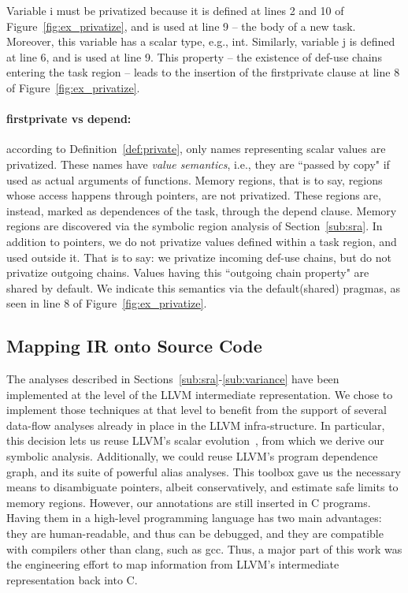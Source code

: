 \documentclass[sigplan,10pt,review,anonymous]{acmart}
\begin{document}
\begin{example}
\label{ex:priv_2}
Variable \textsf{i} must be privatized because it is defined at lines 2 and 10 of
Figure~\ref{fig:ex_privatize}, and is used at line 9 -- the body of a new task.
Moreover, this variable has a scalar type, e.g., \textsf{int}.
Similarly, variable \textsf{j} is defined at line 6, and is used at line 9.
This property -- the existence of def-use chains entering the task region --
leads to the insertion of the \textsf{firstprivate} clause at line 8 of
Figure~\ref{fig:ex_privatize}.
\end{example}

\noindent
\paragraph{firstprivate vs depend:} according to Definition~\ref{def:private},
only names representing scalar values are privatized.
These names have {\em value semantics}, i.e., they are ``passed
by copy" if used as actual arguments of functions.
Memory regions, that is to say, regions whose access happens through pointers,
are not privatized.
These regions are, instead, marked as dependences of the task, through the
\textsf{depend} clause.
Memory regions are discovered via the symbolic region analysis of
Section~\ref{sub:sra}.
In addition to pointers, we do not privatize values defined within
a task region, and used outside it.
That is to say: we privatize incoming def-use chains, but do not privatize
outgoing chains.
Values having this ``outgoing chain property" are shared by default.
We indicate this semantics via the \textsf{default(shared)} pragmas, as seen
in line 8 of Figure~\ref{fig:ex_privatize}.

\subsection{Mapping IR onto Source Code}
\label{sub:ir}

The analyses described in Sections~\ref{sub:sra}-\ref{sub:variance} have
been implemented at the level of the LLVM intermediate representation.
We chose to implement those techniques at that level to benefit from the support
of several data-flow analyses already in place in the LLVM infra-structure.
In particular, this decision lets us reuse LLVM's scalar
evolution~\cite[p.18]{Grosser12}, from which we derive our symbolic analysis.
Additionally, we could reuse LLVM's program dependence graph, and its suite of
powerful alias analyses.
This toolbox gave us the necessary means to disambiguate pointers, albeit
conservatively, and estimate safe limits to memory regions.
However, our annotations are still inserted in C programs.
Having them in a high-level programming language has two main advantages:
they are human-readable, and thus can be debugged, and they are compatible with
compilers other than \textsf{clang}, such as \textsf{gcc}.
Thus, a major part of this work was the engineering effort to map
information from LLVM's intermediate representation back into C.
\end{document}
